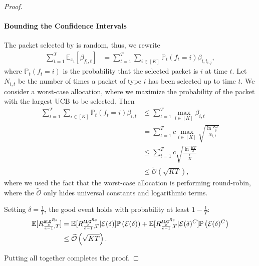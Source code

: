 \begin{proof}
    \paragraph{Bounding the Confidence Intervals}
    The packet selected by \algrs is random, thus, we rewrite
    \begin{align*}
        \sum_{t=1}^T\mathbb{E}_{x_t}[\beta_{f_t,t}] &=  \sum_{t=1}^T\sum_{i \in[K]} \mathbb{P}_t(f_t=i)\beta_{i,t_{i,j}},
    \end{align*}
    where $\mathbb{P}_t(f_t=i)$ is the probability that the selected packet is $i$ at time $t$. Let $N_{i,t}$ be the number of times a packet of type $i$ has been selected up to time $t$. We consider a worst-case allocation, where we maximize the probability of the packet with the largest UCB to be selected. Then
    \begin{align*}
        \sum_{t=1}^T\sum_{i \in[K]} \mathbb{P}_t(f_t=i)\beta_{i,t} &\le \sum_{t=1}^T \max_{i\in[K]}{\beta_{i,t}} \\
        &=  \sum_{t=1}^Tc\max_{i\in[K]}{\sqrt{\frac{\ln \frac{KT}{\delta}}{N_{i,t}}}}\\
        &\le   \sum_{t=1}^Tc{\sqrt{\frac{\ln \frac{KT}{\delta}}{\frac{t}{K}}}} \\
        &\le \widetilde{\mathcal{O}}\left(\sqrt{KT}\right),
    \end{align*}
    where we used the fact that the worst-case allocation is performing round-robin, where the $\widetilde{\mathcal{O}}$ only hides universal constants and logarithmic terms. 

    Setting $\delta=\frac{1}{T}$, the good event holds with probability at least $1-\frac{1}{T}$:
    \begin{align*}
        \mathbb{E}[R_{\frac{e}{e-1},T}^{\text{\algrs}}] &= \mathbb{E}[R_{\frac{e}{e-1},T}^{\text{\algrs}}|\mathcal{E}(\delta)]\mathbb{P}\left(\mathcal{E}(\delta)\right) + \mathbb{E}[R_{\frac{e}{e-1},T}^{\text{\algrs}}|\mathcal{E}(\delta)^C]\mathbb{P}\left(\mathcal{E}(\delta)^C\right) \\
        &\le \widetilde{\mathcal{O}}\left(\sqrt{KT}\right).
    \end{align*}

    Putting all together completes the proof.
\end{proof}